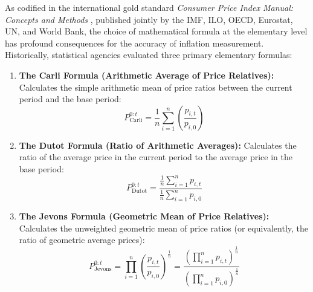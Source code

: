 \hs As codified in the international gold standard \textit{Consumer Price Index Manual: Concepts and Methods} \citep{imf2020cpi}, published jointly by the IMF, ILO, OECD, Eurostat, UN, and World Bank, the choice of mathematical formula at the elementary level has profound consequences for the accuracy of inflation measurement. Historically, statistical agencies evaluated three primary elementary formulas:
\begin{enumerate}
    \item \textbf{The Carli Formula (Arithmetic Average of Price Relatives):} Calculates the simple arithmetic mean of price ratios between the current period and the base period:
    \begin{equation}
        P_{\text{Carli}}^{0:t} = \frac{1}{n} \sum_{i=1}^n \left( \frac{p_{i,t}}{p_{i,0}} \right)
    \end{equation}
    \item \textbf{The Dutot Formula (Ratio of Arithmetic Averages):} Calculates the ratio of the average price in the current period to the average price in the base period:
    \begin{equation}
        P_{\text{Dutot}}^{0:t} = \frac{\frac{1}{n} \sum_{i=1}^n p_{i,t}}{\frac{1}{n} \sum_{i=1}^n p_{i,0}}
    \end{equation}
    \item \textbf{The Jevons Formula (Geometric Mean of Price Relatives):} Calculates the unweighted geometric mean of price ratios (or equivalently, the ratio of geometric average prices):
    \begin{equation}
        P_{\text{Jevons}}^{0:t} = \prod_{i=1}^n \left( \frac{p_{i,t}}{p_{i,0}} \right)^{\frac{1}{n}} = \frac{\left( \prod_{i=1}^n p_{i,t} \right)^{\frac{1}{n}}}{\left( \prod_{i=1}^n p_{i,0} \right)^{\frac{1}{n}}}
    \end{equation}
\end{enumerate}

